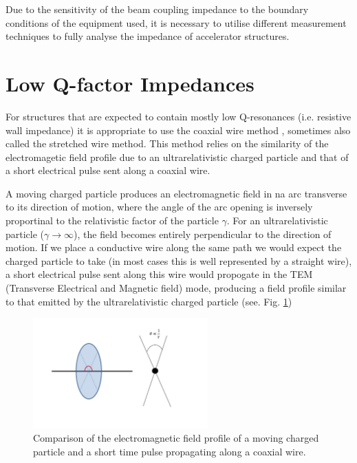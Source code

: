

Due to the sensitivity of the beam coupling impedance to the boundary conditions of the equipment used, it is necessary to utilise different measurement techniques to fully analyse the impedance of accelerator structures.

\section{Low Q-factor Impedances}
\label{sec:coax_wire_meth}

For structures that are expected to contain mostly low Q-resonances (i.e. resistive wall impedance) it is appropriate to use the coaxial wire method \cite{Gluckstern:WireMeasImp, Vaccaro:ImprovedWireMeth}, sometimes also called the stretched wire method. This method relies on the similarity of the electromagetic field profile due to an ultrarelativistic charged particle and that of a short electrical pulse sent along a coaxial wire. 

A moving charged particle produces an electromagnetic field in na arc transverse to its direction of motion, where the angle of the arc opening is inversely proportinal to the relativistic factor of the particle $\gamma$. For an ultrarelativistic particle ($\gamma \rightarrow \infty$), the field becomes entirely perpendicular to the direction of motion. If we place a conductive wire along the same path we would expect the charged particle to take (in most cases this is well represented by a straight wire), a short electrical pulse sent along this wire would propogate in the TEM (Transverse Electrical and Magnetic field) mode, producing a field profile similar to that emitted by the ultrarelativistic charged particle (see. Fig. \ref{fig:coax-part-profile})


\begin{figure}
\begin{center}
\includegraphics[width=0.6\textwidth]{Bench_Top_Measurements/figures/coaxial-particle-fields.pdf}
\end{center}
\caption{Comparison of the electromagnetic field profile of a moving charged particle and a short time pulse propagating along a coaxial wire.}
\label{fig:coax-part-profile}
\end{figure}

